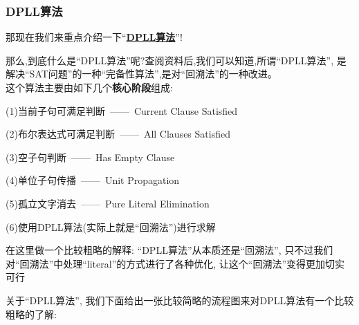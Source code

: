         \subsubsection{DPLL算法}
        那现在我们来重点介绍一下``\underline{\textbf{DPLL算法}}''!\par
        那么,到底什么是``DPLL算法''呢?查阅资料后,我们可以知道,所谓``DPLL算法'',
        是解决``SAT问题''的一种``完备性算法'',是对``回溯法''的一种改进。\\
        \newline
        \noindent
        这个算法主要由如下几个\textbf{核心阶段}组成:\par
            (1)当前子句可满足判断\ ——\ Current Clause Satisfied\par
            (2)布尔表达式可满足判断\ ——\ All Clauses Satisfied\par
            (3)空子句判断\ ——\ Has Empty Clause\par
            (4)单位子句传播\ ——\ Unit Propagation\par
            (5)孤立文字消去\ ——\ Pure Literal Elimination\par
            (6)使用DPLL算法(实际上就是``回溯法'')进行求解\\
        \par
        在这里做一个比较粗略的解释:
        ``DPLL算法''从本质还是``回溯法'',
        只不过我们对``回溯法''中处理``literal''的方式进行了各种优化,
        让这个``回溯法''变得更加切实可行
        \par
        关于``DPLL算法'',
        我们下面给出一张比较简略的流程图来对DPLL算法有一个比较粗略的了解:

